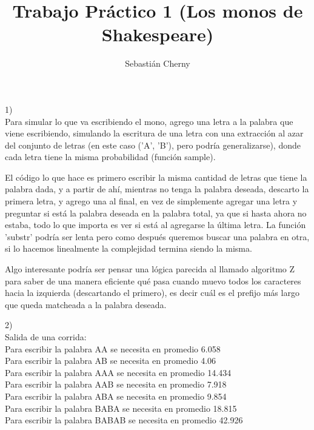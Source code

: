 \documentclass[a4paper]{article}
\title{Trabajo Práctico 1 (Los monos de Shakespeare)}
\author{Sebastián Cherny}
\begin{document}
\maketitle

1)\\
Para simular lo que va escribiendo el mono, agrego una letra a la palabra que viene escribiendo, simulando la escritura de una letra con una extracción al azar del conjunto de letras (en este caso ('A', 'B'), pero podría generalizarse), donde cada letra tiene la misma probabilidad (función sample).

El código lo que hace es primero escribir la misma cantidad de letras que tiene la palabra dada, y a partir de ahí, mientras no tenga la palabra deseada, descarto la primera letra, y agrego una al final, en vez de simplemente agregar una letra y preguntar si está la palabra deseada en la palabra total, ya que si hasta ahora no estaba, todo lo que importa es ver si está al agregarse la última letra.
La función 'substr' podría ser lenta pero como después queremos buscar una palabra en otra, si lo hacemos linealmente la complejidad termina siendo la misma.

Algo interesante podría ser pensar una lógica parecida al llamado algoritmo Z para saber de una manera eficiente qué pasa cuando muevo todos los caracteres hacia la izquierda (descartando el primero), es decir cuál es el prefijo más largo que queda matcheada a la palabra deseada.

2)\\
Salida de una corrida:
\\
Para escribir la palabra AA se necesita en promedio 6.058\\
Para escribir la palabra AB se necesita en promedio 4.06\\
Para escribir la palabra AAA se necesita en promedio 14.434\\
Para escribir la palabra AAB se necesita en promedio 7.918\\
Para escribir la palabra ABA se necesita en promedio 9.854\\
Para escribir la palabra BABA se necesita en promedio 18.815\\
Para escribir la palabra BABAB se necesita en promedio 42.926\\
\end{document}
